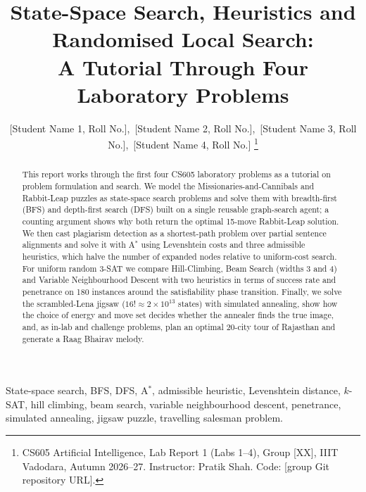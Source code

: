 \documentclass[journal]{IEEEtran}
\begin{document}
\title{State-Space Search, Heuristics and Randomised Local Search:\\ A Tutorial Through Four Laboratory Problems}

\author{[Student Name 1, Roll No.],~[Student Name 2, Roll No.],~[Student Name 3, Roll No.],~[Student Name 4, Roll No.]%
\thanks{CS605 Artificial Intelligence, Lab Report 1 (Labs 1--4), Group [XX], IIIT Vadodara, Autumn 2026--27. Instructor: Pratik Shah. Code: [group Git repository URL].}}


\maketitle

\begin{abstract}
This report works through the first four CS605 laboratory problems as a tutorial on problem
formulation and search. We model the Missionaries-and-Cannibals and Rabbit-Leap puzzles as
state-space search problems and solve them with breadth-first (BFS) and depth-first search
(DFS) built on a single reusable graph-search agent; a counting argument shows why both
return the optimal 15-move Rabbit-Leap solution. We then cast plagiarism detection as a
shortest-path problem over partial sentence alignments and solve it with A$^*$ using
Levenshtein costs and three admissible heuristics, which halve the number of expanded nodes
relative to uniform-cost search. For uniform random 3-SAT we compare Hill-Climbing, Beam
Search (widths 3 and 4) and Variable Neighbourhood Descent with two heuristics in terms of
success rate and penetrance on 180 instances around the satisfiability phase transition.
Finally, we solve the scrambled-Lena jigsaw ($16! \approx 2\times10^{13}$ states) with
simulated annealing, show how the choice of energy and move set decides whether the
annealer finds the true image, and, as in-lab and challenge problems, plan an optimal
20-city tour of Rajasthan and generate a Raag Bhairav melody.
\end{abstract}

\begin{IEEEkeywords}
State-space search, BFS, DFS, A$^*$, admissible heuristic, Levenshtein distance, $k$-SAT,
hill climbing, beam search, variable neighbourhood descent, penetrance, simulated annealing,
jigsaw puzzle, travelling salesman problem.
\end{IEEEkeywords}
\end{document}

